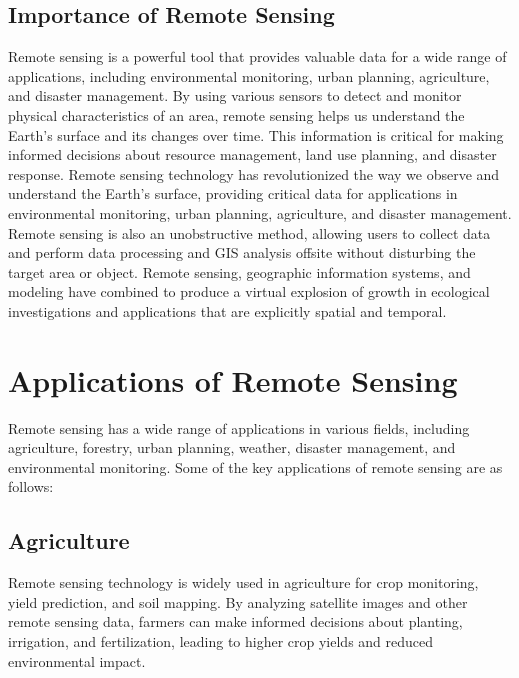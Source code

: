 \documentclass[conference]{IEEEtran}
\begin{document}
\subsection{Importance of Remote Sensing}
Remote sensing is a powerful tool that provides valuable data for a wide range of applications, including environmental monitoring, urban planning, agriculture, and disaster management. By using various sensors to detect and monitor physical characteristics of an area, remote sensing helps us understand the Earth's surface and its changes over time. This information is critical for making informed decisions about resource management, land use planning, and disaster response. Remote sensing technology has revolutionized the way we observe and understand the Earth's surface, providing critical data for applications in environmental monitoring, urban planning, agriculture, and disaster management. Remote sensing is also an unobstructive method, allowing users to collect data and perform data processing and GIS analysis offsite without disturbing the target area or object. Remote sensing, geographic information systems, and modeling have combined to produce a virtual explosion of growth in ecological investigations and applications that are explicitly spatial and temporal. \cite{cohen2004landsat} 

\section{Applications of Remote Sensing}
Remote sensing has a wide range of applications in various fields, including agriculture, forestry, urban planning, weather, disaster management, and environmental monitoring. Some of the key applications of remote sensing are as follows:

\subsection{Agriculture}
Remote sensing technology is widely used in agriculture for crop monitoring, yield prediction, and soil mapping. By analyzing satellite images and other remote sensing data, farmers can make informed decisions about planting, irrigation, and fertilization, leading to higher crop yields and reduced environmental impact.
\end{document}
